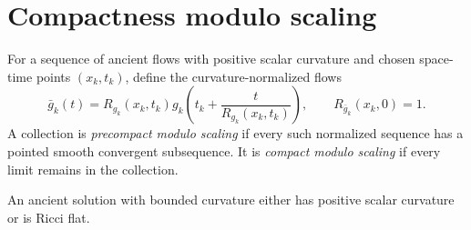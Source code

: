 \section{Compactness modulo scaling}

\begin{definition}
\label{def:chow-iii-compact-modulo-scaling}

For a sequence of ancient flows with positive scalar curvature and chosen
space-time points $(x_k,t_k)$, define the curvature-normalized flows
\[
 \bar g_k(t)=R_{g_k}(x_k,t_k)
 g_k\!\left(t_k+\frac{t}{R_{g_k}(x_k,t_k)}\right),
 \qquad R_{\bar g_k}(x_k,0)=1.
\]
A collection is \emph{precompact modulo scaling} if every such normalized
sequence has a pointed smooth convergent subsequence.  It is \emph{compact
modulo scaling} if every limit remains in the collection.
\end{definition}

\begin{remark}
\label{rem:chow-iii-ancient-positive-or-ricci-flat}

An ancient solution with bounded curvature either has positive scalar
curvature or is Ricci flat.
\end{remark}

